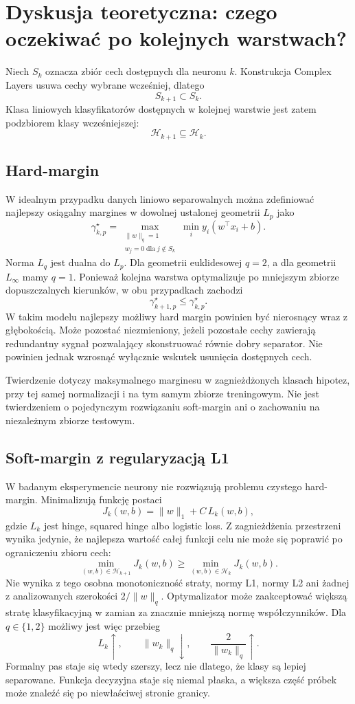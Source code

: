 \documentclass[11pt,a4paper]{article}
\begin{document}
\section{Dyskusja teoretyczna: czego oczekiwać po kolejnych warstwach?}

Niech $S_k$ oznacza zbiór cech dostępnych dla neuronu $k$. Konstrukcja Complex Layers usuwa cechy wybrane
wcześniej, dlatego
\[
S_{k+1}\subset S_k.
\]
Klasa liniowych klasyfikatorów dostępnych w kolejnej warstwie jest zatem podzbiorem klasy wcześniejszej:
\[
\mathcal H_{k+1}\subseteq\mathcal H_k.
\]

\subsection*{Hard-margin}

W idealnym przypadku danych liniowo separowalnych można zdefiniować najlepszy osiągalny margines w dowolnej
ustalonej geometrii $L_p$ jako
\[
\gamma_{k,p}^{\star}=
\max_{\substack{\lVert w\rVert_q=1\\ w_j=0\;\mathrm{dla}\;j\notin S_k}}
\min_i y_i(w^\top x_i+b).
\]
Norma $L_q$ jest dualna do $L_p$. Dla geometrii euklidesowej $q=2$, a dla geometrii $L_\infty$ mamy
$q=1$. Ponieważ kolejna warstwa optymalizuje po mniejszym zbiorze dopuszczalnych kierunków, w obu przypadkach
zachodzi
\[
\gamma_{k+1,p}^{\star}\leq\gamma_{k,p}^{\star}.
\]
W takim modelu najlepszy możliwy hard margin powinien być nierosnący wraz z głębokością. Może pozostać
niezmieniony, jeżeli pozostałe cechy zawierają redundantny sygnał pozwalający skonstruować równie dobry
separator. Nie powinien jednak wzrosnąć wyłącznie wskutek usunięcia dostępnych cech.

Twierdzenie dotyczy maksymalnego marginesu w zagnieżdżonych klasach hipotez, przy tej samej normalizacji i na
tym samym zbiorze treningowym. Nie jest twierdzeniem o pojedynczym rozwiązaniu soft-margin ani o zachowaniu
na niezależnym zbiorze testowym.

\subsection*{Soft-margin z regularyzacją L1}

W badanym eksperymencie neurony nie rozwiązują problemu czystego hard-margin. Minimalizują funkcję postaci
\[
J_k(w,b)=\lVert w\rVert_1+C\,L_k(w,b),
\]
gdzie $L_k$ jest hinge, squared hinge albo logistic loss. Z zagnieżdżenia przestrzeni wynika jedynie, że
najlepsza wartość całej funkcji celu nie może się poprawić po ograniczeniu zbioru cech:
\[
\min_{(w,b)\in\mathcal H_{k+1}}J_k(w,b)
\geq
\min_{(w,b)\in\mathcal H_k}J_k(w,b).
\]
Nie wynika z tego osobna monotoniczność straty, normy L1, normy L2 ani żadnej z analizowanych szerokości
$2/\lVert w\rVert_q$. Optymalizator może zaakceptować większą stratę klasyfikacyjną w zamian za znacznie
mniejszą normę współczynników. Dla $q\in\{1,2\}$ możliwy jest więc przebieg
\[
L_k\uparrow,
\qquad
\lVert w_k\rVert_q\downarrow,
\qquad
\frac{2}{\lVert w_k\rVert_q}\uparrow.
\]
Formalny pas staje się wtedy szerszy, lecz nie dlatego, że klasy są lepiej separowane. Funkcja decyzyjna
staje się niemal płaska, a większa część próbek może znaleźć się po niewłaściwej stronie granicy.
\end{document}
